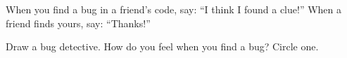 \begin{tip}
When you find a bug in a friend's code, say: \enquote{I think I found a clue!} When a friend finds yours, say: \enquote{Thanks!}
\end{tip}

\begin{vocab}
\end{vocab}

\begin{reflection}
Draw a bug detective. How do you feel when you find a bug? Circle one.

\begin{center}
\Huge\faSmile[regular]\qquad\faMeh[regular]\qquad\faFrown[regular]
\end{center}
\answerspace{3.5cm}
\end{reflection}
